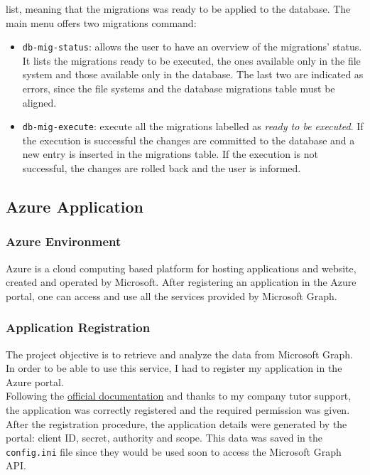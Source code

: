 \documentclass[12pt, a4paper, oneside]{article}
\begin{document}
list, meaning that the migrations was ready to be applied to the database.
\newline\newline\newline\newline
The main menu offers two migrations command:
\begin{itemize}
    \item \texttt{db-mig-status}: allows the user to have an overview of the migrations' status. It lists the migrations ready to be executed, the ones available only in the file system and those available
            only in the database. The last two are indicated as errors, since the file systems and the database migrations table must be aligned.
    \item \texttt{db-mig-execute}: execute all the migrations labelled as \emph{ready to be executed}. If the execution is successful the changes are committed to the database and a new entry is inserted in the
            migrations table. If the execution is not successful, the changes are rolled back and the user is informed.
\end{itemize}

\subsection{Azure Application}
\subsubsection{Azure Environment}
Azure is a cloud computing based platform for hosting applications and website, created and operated by Microsoft. After registering an application in the Azure portal, one can access and use all the services
provided by Microsoft Graph.
\subsubsection{Application Registration}
The project objective is to retrieve and analyze the data from Microsoft Graph. In order to be able to use this service, I had to register my application in the Azure portal.\\
Following the \href{https://docs.microsoft.com/en-us/graph/auth-v2-service#authentication-and-authorization-steps}{official documentation} and thanks to my company tutor support, the application was correctly
registered and the required permission was given. After the registration procedure, the application details were generated by the portal: client ID, secret, authority and scope. This data was saved in the 
\texttt{config.ini} file since they would be used soon to access the Microsoft Graph API.
\end{document}
